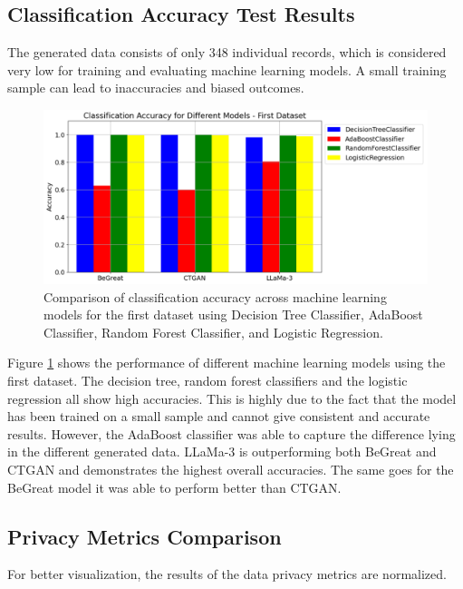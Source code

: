 \subsection{Classification Accuracy Test Results}

The generated data consists of only 348 individual records, which is considered very low for training and evaluating machine learning models. A small training sample can lead to inaccuracies and biased outcomes. 


\begin{figure}[H]
    \centering
        \centering
        \includegraphics[width=1\textwidth]{images/dataset1_ml.png}
        \caption{Comparison of classification accuracy across machine learning models for the first dataset using Decision Tree Classifier, AdaBoost Classifier, Random Forest Classifier, and Logistic Regression.}
        \label{fig:dataset1_ml}
\end{figure}

Figure \ref{fig:dataset1_ml} shows the performance of different machine learning models using the first dataset. The decision tree, random forest classifiers and the logistic regression all show high accuracies. This is highly due to the fact that the model has been trained on a small sample and cannot give consistent and accurate results. However, the AdaBoost classifier was able to capture the difference lying in the different generated data. LLaMa-3 is outperforming both BeGreat and CTGAN and demonstrates the highest overall accuracies. The same goes for the BeGreat model it was able to perform better than CTGAN.



\subsection{Privacy Metrics Comparison}

For better visualization, the results of the data privacy metrics are normalized. 



